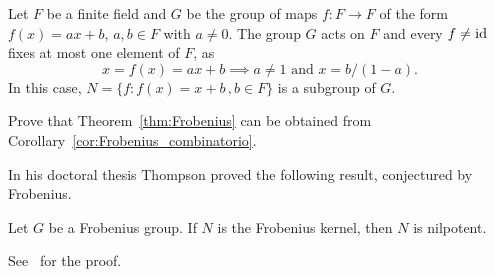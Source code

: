 \begin{example}
  Let $F$ be a finite field and $G$ be the group of maps 
  $f\colon F\to F$ of the form 
  $f(x)=ax+b$, $a,b\in F$ with $a\ne0$. The group $G$ acts on 
  $F$ and every 
  $f\ne\operatorname{id}$ fixes at most one element of $F$, as 
  \[
	x=f(x)=ax+b\implies a\ne 1\text{ and } x=b/(1-a).
  \]
  In this case, $N=\{f:f(x)=x+b\,,b\in F\}$ 
  is a subgroup of $G$.
\end{example}

\begin{exercise}
    Prove that Theorem~\ref{thm:Frobenius} can be obtained from
    Corollary~\ref{cor:Frobenius_combinatorio}.
\end{exercise}



In his doctoral thesis Thompson proved the following result, conjectured
by Frobenius. 

\begin{theorem}[Thompson]
    Let $G$ be a Frobenius group. If $N$ is the Frobenius kernel, then $N$ 
    is nilpotent.
\end{theorem}

See~\cite[Theorem 6.24]{MR2426855} for the proof.




